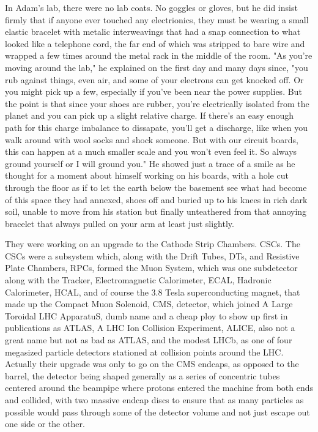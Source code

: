 In Adam's lab, there were no lab coats. No goggles or gloves, but he did insist firmly that if anyone ever touched any electrionics, they must be wearing a small elastic bracelet with metalic interweavings that had a snap connection to what looked like a telephone cord, the far end of which was stripped to bare wire and wrapped a few times around the metal rack in the middle of the room. "As you're moving around the lab," he explained on the first day and many days since, "you rub against things, even air, and some of your electrons can get knocked off. Or you might pick up a few, especially if you've been near the power supplies. But the point is that since your shoes are rubber, you're electrically isolated from the planet and you can pick up a slight relative charge. If there's an easy enough path for this charge imbalance to dissapate, you'll get a discharge, like when you walk around with wool socks and shock someone. But with our circuit boards, this can happen at a much smaller scale and you won't even feel it. So always ground yourself or I will ground you." He showed just a trace of a smile as he thought for a moment about himself working on his boards, with a hole cut through the floor as if to let the earth below the basement see what had become of this space they had annexed, shoes off and buried up to his knees in rich dark soil, unable to move from his station but finally unteathered from that annoying bracelet that always pulled on your arm at least just slightly.

They were working on an upgrade to the Cathode Strip Chambers. CSCs. The CSCs were a subsystem which, along with the Drift Tubes, DTs, and Resistive Plate Chambers, RPCs, formed the Muon System, which was one subdetector along with the Tracker, Electromagnetic Calorimeter, ECAL, Hadronic Calorimeter, HCAL, and of course the 3.8 Tesla superconducting magnet, that made up the Compact Muon Solenoid, CMS, detector, which joined A Large Toroidal LHC ApparatuS, dumb name and a cheap ploy to show up first in publications as ATLAS, A LHC Ion Collision Experiment, ALICE, also not a great name but not as bad as ATLAS, and the modest LHCb, as one of four megasized particle detectors stationed at collision points around the LHC. Actually their upgrade was only to go on the CMS endcaps, as opposed to the barrel, the detector being shaped generally as a series of concentric tubes centered around the beampipe where protons entered the machine from both ends and collided, with two massive endcap discs to ensure that as many particles as possible would pass through some of the detector volume and not just escape out one side or the other.

